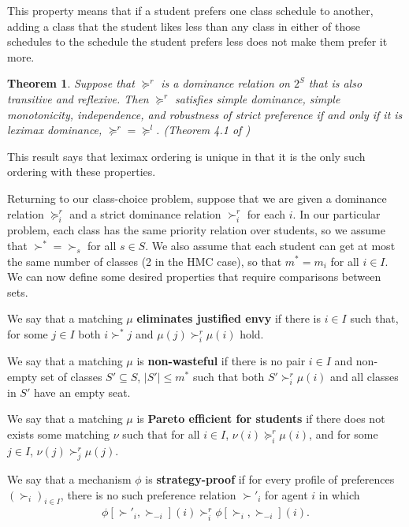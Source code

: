 \documentclass[12pt,letterpaper]{extarticle}
\newtheorem{theo}{Theorem}
\begin{document}
This property means that if a student prefers one class schedule to another, adding a class that the student likes less than any class in either of those schedules to the schedule the student prefers less does not make them prefer it more.

\begin{theo}
Suppose that $\succcurlyeq^r$ is a dominance relation on $2^S$ that is also transitive and reflexive. Then $\succcurlyeq^r$ satisfies simple dominance, simple monotonicity, independence, and robustness of strict preference if and only if it is leximax dominance, $\succcurlyeq^r = \succcurlyeq^l$. (\textit{Theorem 4.1} of \cite{bossert})
\end{theo}

This result says that leximax ordering is unique in that it is the only such ordering with these properties.

Returning to our class-choice problem, suppose that we are given a dominance relation $\succcurlyeq^r_i$ and a strict dominance relation $\succ^r_i$ for each $i$. In our particular problem, each class has the same priority relation over students, so we assume that $\succ^* = \succ_s$ for all $s \in S$. We also assume that each student can get at most the same number of classes (2 in the HMC case), so that $m^* = m_i$ for all $i \in I$. We can now define some desired properties that require comparisons between sets.

We say that a matching $\mu$ \textbf{eliminates justified envy} if there is $i \in I$ such that, for some $j \in I$ both $i \succ^* j$ and $\mu(j) \succ^r_i \mu(i)$ hold.

We say that a matching $\mu$ is \textbf{non-wasteful} if there is no pair $i \in I$ and non-empty set of classes $S' \subseteq S$, $|S'| \leq m^*$ such that both $S' \succ^r_i \mu(i)$ and all classes in $S'$ have an empty seat.

We say that a matching $\mu$ is \textbf{Pareto efficient for students} if there does not exists some matching $\nu$ such that for all $i \in I$, $\nu(i) \succcurlyeq^r_i \mu(i)$, and for some $j \in I$, $\nu(j) \succ^r_j \mu(j)$.

We say that a mechanism $\phi$ is \textbf{strategy-proof} if for every profile of preferences $(\succ_i)_{i \in I}$, there is no such preference relation $\succ'_{i}$ for agent $i$ in which
\begin{align*}
    \phi[\succ'_i,\succ_{-i}](i) \succ^r_i \phi[\succ_i,\succ_{-i}](i).
\end{align*}
\end{document}
